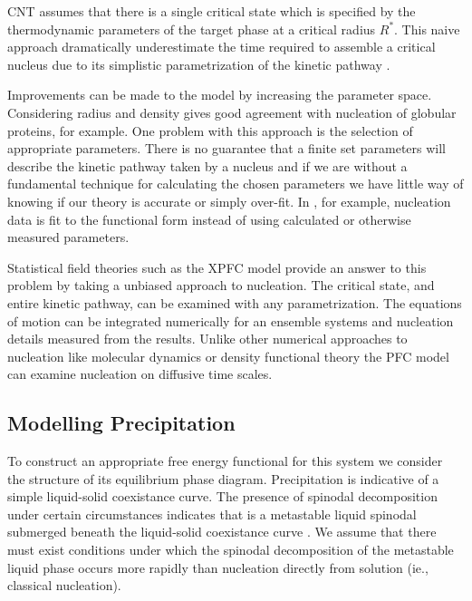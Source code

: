 
CNT assumes that there is a single critical state which is specified by the
thermodynamic parameters of the target phase at a critical radius $R^*$. This
naive approach dramatically underestimate the time required to assemble a
critical nucleus due to its simplistic parametrization of the kinetic pathway
\cite{LUTSKO15, MYERSON04, MYERSON09}.

Improvements can be made to the model by increasing the parameter space.
Considering radius and density \cite{LUTSKO15} gives good agreement with
nucleation of globular proteins, for example. One problem with this approach is
the selection of appropriate parameters. There is no guarantee that a finite
set parameters will describe the kinetic pathway taken by a nucleus and if we
are without a fundamental technique for calculating the chosen parameters we
have little way of knowing if our theory is accurate or simply over-fit. In
\cite{MYERSON09}, for example, nucleation data is fit to the functional form
instead of using calculated or otherwise measured parameters.


Statistical field theories such as the XPFC model provide an answer to this
problem by taking a unbiased approach to nucleation. The critical state, and
entire kinetic pathway, can be examined with any parametrization. The equations
of motion can be integrated numerically for an ensemble systems and nucleation
details measured from the results. Unlike other numerical approaches to
nucleation like molecular dynamics or density functional theory the PFC model
can examine nucleation on diffusive time scales.

\subsection{Modelling Precipitation} %


To construct an appropriate free energy functional for this system we consider
the structure of its equilibrium phase diagram. Precipitation is indicative of
a simple liquid-solid coexistance curve. The presence of spinodal decomposition
under certain circumstances indicates that is a metastable liquid spinodal
submerged beneath the liquid-solid coexistance curve \cite{DAVEY13}. We assume
that there must exist conditions under which the spinodal decomposition of the
metastable liquid phase occurs more rapidly than nucleation directly from
solution (ie., classical nucleation).

